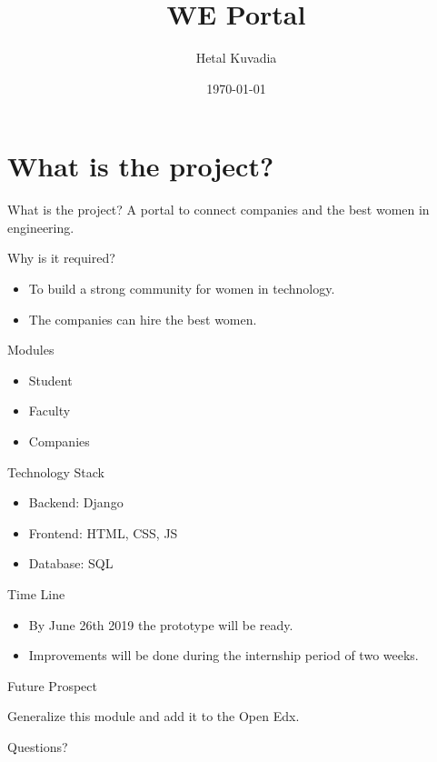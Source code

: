 \documentclass{beamer}
\title[Short title]{WE Portal}
\author{Hetal Kuvadia}
\date{\today}
\begin{document}
\begin{frame}
\titlepage 
\end{frame}


\section{What is the project?}
\begin{frame}{What is the project?}
        A portal to connect companies and the best women in engineering.

\end{frame}

\begin{frame}{Why is it required?}
\begin{itemize}
    \item  To build a strong community for women in technology.
    \pause
    \item The companies can hire the best women.

\end{itemize}
\end{frame}

\begin{frame}{Modules}
    \begin{itemize}
        \item Student
		\item Faculty
		\item Companies
    \end{itemize}
\end{frame}

\begin{frame}{Technology Stack}
    \begin{itemize}
        \item Backend: Django
		\item Frontend: HTML, CSS, JS
		\item Database: SQL
    \end{itemize}
\end{frame}

\begin{frame}{Time Line}
    \begin{itemize}
        \item By June 26th 2019 the prototype will be ready.
        \item Improvements will be done during the internship period of two weeks.
    \end{itemize}
\end{frame}

\begin{frame}{Future Prospect}
   
    \begin{center}
        Generalize this module and add it to the Open Edx.
    \end{center}
        
    
\end{frame}

\begin{frame}
    \begin{center}
        Questions?
    \end{center}
\end{frame}
\end{document}
